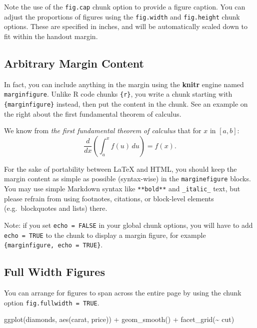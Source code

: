 \documentclass[]{tufte-handout}
\newenvironment{Shaded}{}{}
\newcommand{\FunctionTok}[1]{\textcolor[rgb]{0.02,0.16,0.49}{#1}}
\newcommand{\NormalTok}[1]{#1}
\newcommand{\SpecialCharTok}[1]{\textcolor[rgb]{0.25,0.44,0.63}{#1}}
\begin{document}
Note the use of the \texttt{fig.cap} chunk option to provide a figure
caption. You can adjust the proportions of figures using the
\texttt{fig.width} and \texttt{fig.height} chunk options. These are
specified in inches, and will be automatically scaled down to fit within
the handout margin.

\hypertarget{arbitrary-margin-content}{%
\subsection{Arbitrary Margin Content}\label{arbitrary-margin-content}}

In fact, you can include anything in the margin using the \textbf{knitr}
engine named \texttt{marginfigure}. Unlike R code chunks
\texttt{\textasciigrave{}\textasciigrave{}\textasciigrave{}\{r\}}, you
write a chunk starting with
\texttt{\textasciigrave{}\textasciigrave{}\textasciigrave{}\{marginfigure\}}
instead, then put the content in the chunk. See an example on the right
about the first fundamental theorem of calculus.

\begin{marginfigure}
We know from \emph{the first fundamental theorem of calculus} that for
\(x\) in \([a, b]\):
\[\frac{d}{dx}\left( \int_{a}^{x} f(u)\,du\right)=f(x).\]
\end{marginfigure}

For the sake of portability between LaTeX and HTML, you should keep the
margin content as simple as possible (syntax-wise) in the
\texttt{marginefigure} blocks. You may use simple Markdown syntax like
\texttt{**bold**} and \texttt{\_italic\_} text, but please refrain from
using footnotes, citations, or block-level elements (e.g.~blockquotes
and lists) there.

Note: if you set \texttt{echo\ =\ FALSE} in your global chunk options,
you will have to add \texttt{echo\ =\ TRUE} to the chunk to display a
margin figure, for example
\texttt{\textasciigrave{}\textasciigrave{}\textasciigrave{}\{marginfigure,\ echo\ =\ TRUE\}}.

\hypertarget{full-width-figures}{%
\subsection{Full Width Figures}\label{full-width-figures}}

You can arrange for figures to span across the entire page by using the
chunk option \texttt{fig.fullwidth\ =\ TRUE}.

\begin{Shaded}
\begin{Highlighting}[]
\FunctionTok{ggplot}\NormalTok{(diamonds, }\FunctionTok{aes}\NormalTok{(carat, price)) }\SpecialCharTok{+} \FunctionTok{geom\_smooth}\NormalTok{() }\SpecialCharTok{+}
  \FunctionTok{facet\_grid}\NormalTok{(}\SpecialCharTok{\textasciitilde{}}\NormalTok{ cut)}
\end{Highlighting}
\end{Shaded}
\end{document}
